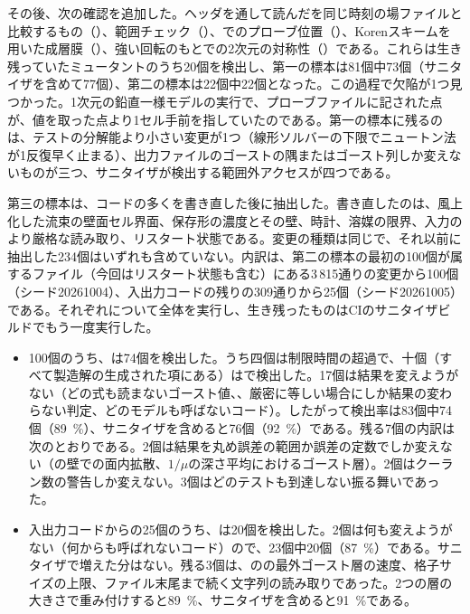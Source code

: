その後、次の確認を追加した。ヘッダを通して読んだを同じ時刻の場ファイルと比較するもの（）、範囲チェック（）、でのプローブ位置（）、Korenスキームを用いた成層膜（）、強い回転のもとでの2次元の対称性（）である。これらは生き残っていたミュータントのうち20個を検出し、第一の標本は81個中73個（サニタイザを含めて77個）、第二の標本は22個中22個となった。この過程で欠陥が1つ見つかった。1次元の鉛直一様モデルの実行で、プローブファイルに記された点が、値を取った点より1セル手前を指していたのである。第一の標本に残るのは、テストの分解能より小さい変更が1つ（線形ソルバーの下限でニュートン法が1反復早く止まる）、出力ファイルのゴーストの隅またはゴースト列しか変えないものが三つ、サニタイザが検出する範囲外アクセスが四つである。

第三の標本は、コードの多くを書き直した後に抽出した。書き直したのは、風上化した流束の壁面セル界面、保存形の濃度とその壁、時計、溶媒の限界、入力のより厳格な読み取り、リスタート状態である。変更の種類は同じで、それ以前に抽出した234個はいずれも含めていない。内訳は、第二の標本の最初の100個が属するファイル（今回はリスタート状態も含む）にある3\,815通りの変更から100個（シード20261004）、入出力コードの残りの309通りから25個（シード20261005）である。それぞれについて全体を実行し、生き残ったものはCIのサニタイザビルドでもう一度実行した。

\begin{itemize}
  \item 100個のうち、は74個を検出した。うち四個は制限時間の超過で、十個（すべて製造解の生成された項にある）はで検出した。17個は結果を変えようがない（どの式も読まないゴースト値、、厳密に等しい場合にしか結果の変わらない判定、どのモデルも呼ばないコード）。したがって検出率は83個中74個（\SI{89}{\percent}）、サニタイザを含めると76個（\SI{92}{\percent}）である。残る7個の内訳は次のとおりである。2個は結果を丸め誤差の範囲か誤差の定数でしか変えない（の壁での面内拡散、$1/\mu$の深さ平均におけるゴースト層）。2個はクーラン数の警告しか変えない。3個はどのテストも到達しない振る舞いであった。
  \item 入出力コードからの25個のうち、は20個を検出した。2個は何も変えようがない（何からも呼ばれないコード）ので、23個中20個（\SI{87}{\percent}）である。サニタイザで増えた分はない。残る3個は、のの最外ゴースト層の速度、格子サイズの上限、ファイル末尾まで続く文字列の読み取りであった。2つの層の大きさで重み付けすると\SI{89}{\percent}、サニタイザを含めると\SI{91}{\percent}である。
\end{itemize}

